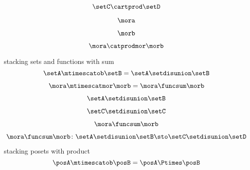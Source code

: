 \begin{forslides}
    \begin{equation}
        \label{eq:combination-010}
        \setC \cartprod \setD
    \end{equation}

    \begin{equation}
        \label{eq:combination-011}
       \mora
    \end{equation}

    \begin{equation}
        \label{eq:combination-012}
        \morb
    \end{equation}

\begin{equation}
        \label{eq:combination-012b}
        \mora \catprodmor \morb
    \end{equation}


stacking sets and functions with sum
    \begin{equation}
        \label{eq:combination-013}
       \setA \mtimescatob \setB = \setA \setdisunion \setB
    \end{equation}

    \begin{equation}
        \label{eq:combination-014}
        \mora \mtimescatmor \morb = \mora \funcsum \morb
    \end{equation}
    
    \begin{equation}
        \label{eq:combination-015}
         \setA \setdisunion \setB
    \end{equation}

    \begin{equation}
        \label{eq:combination-016}
       \setC \setdisunion \setC
    \end{equation}

    \begin{equation}
        \label{eq:combination-017}
         \mora \funcsum \morb
    \end{equation}

    \begin{equation}
        \label{eq:combination-018}
       \mora \funcsum \morb \colon \setA \setdisunion \setB \sto \setC \setdisunion \setD
    \end{equation}

stacking posets with product
    \begin{equation}
        \label{eq:combination-019}
        \posA \mtimescatob \posB = \posA \Ptimes \posB
    \end{equation}


\end{forslides}

